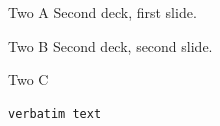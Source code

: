 \documentclass{beamer}
\begin{document}
\begin{frame}{Two A}
  Second deck, first slide.
\end{frame}

\begin{frame}{Two B}
  Second deck, second slide.
\end{frame}

\begin{frame}[fragile]{Two C}
\begin{verbatim}
verbatim text
\end{verbatim}
\end{frame}
\end{document}
